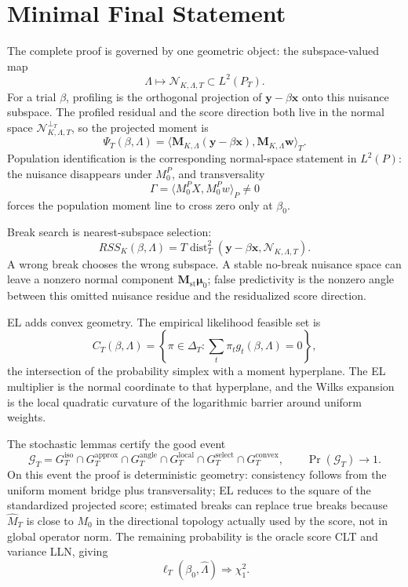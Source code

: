 \documentclass[12pt]{article}
\numberwithin{equation}{section}
\theoremstyle{definition}
\newcommand{\N}{\mathcal N}
\newcommand{\innerT}[2]{\langle #1,#2\rangle_T}
\newcommand{\innerP}[2]{\langle #1,#2\rangle_P}
\begin{document}
\section{Minimal Final Statement}

The complete proof is governed by one geometric object: the subspace-valued map
\[
    \Lambda\longmapsto \N_{K,\Lambda,T}\subset L^2(P_T).
\]
For a trial \(\beta\), profiling is the orthogonal projection of
\(\bm y-\beta\bm x\) onto this nuisance subspace. The profiled residual and the
score direction both live in the normal space
\(\N_{K,\Lambda,T}^{\perp_T}\), so the projected moment is
\[
    \Psi_T(\beta,
    \Lambda)=\innerT{\bm M_{K,\Lambda}(\bm y-\beta\bm x)}
                    {\bm M_{K,\Lambda}\bm w}.
\]
Population identification is the corresponding normal-space statement in
\(L^2(P)\): the nuisance disappears under \(M_0^P\), and transversality
\[
    \Gamma=\innerP{M_0^PX}{M_0^Pw}\ne0
\]
forces the population moment line to cross zero only at \(\beta_0\).

Break search is nearest-subspace selection:
\[
    RSS_K(\beta,\Lambda)
    =T\operatorname{dist}_T^2(\bm y-\beta\bm x,
      \N_{K,\Lambda,T}).
\]
A wrong break chooses the wrong subspace. A stable no-break nuisance space can
leave a nonzero normal component \(\bm M_{\mathrm{st}}\bm\mu_0\); false
predictivity is the nonzero angle between this omitted nuisance residue and the
residualized score direction.

EL adds convex geometry. The empirical likelihood feasible set is
\[
    C_T(\beta,\Lambda)=
    \left\{\pi\in\Delta_T:\sum_t\pi_tg_t(\beta,\Lambda)=0\right\},
\]
the intersection of the probability simplex with a moment hyperplane. The EL
multiplier is the normal coordinate to that hyperplane, and the Wilks expansion
is the local quadratic curvature of the logarithmic barrier around uniform
weights.

The stochastic lemmas certify the good event
\[
    \mathcal G_T
    =G_T^{\mathrm{iso}}
     \cap G_T^{\mathrm{approx}}
     \cap G_T^{\mathrm{angle}}
     \cap G_T^{\mathrm{local}}
     \cap G_T^{\mathrm{select}}
     \cap G_T^{\mathrm{convex}},
    \qquad \Pr(\mathcal G_T)\to1.
\]
On this event the proof is deterministic geometry: consistency follows from the
uniform moment bridge plus transversality; EL reduces to the square of the
standardized projected score; estimated breaks can replace true breaks because
\(\widehat M_T\) is close to \(M_0\) in the directional topology actually used by
the score, not in global operator norm. The remaining probability is the oracle
score CLT and variance LLN, giving
\[
    \ell_T(\beta_0,\widehat\Lambda)\Rightarrow\chi_1^2.
\]
\end{document}
